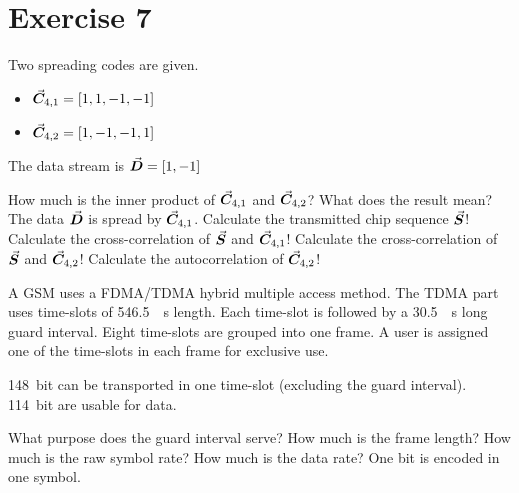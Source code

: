 %
%
%

{}
\section*{Exercise 7}


\begin{question}[subtitle={DS-CDMA}]
	Two spreading codes are given.
	\begin{itemize}
		\item $\vec{\bm{C}}_{4,1} = \left[1,1,-1,-1\right]$
		\item $\vec{\bm{C}}_{4,2} = \left[1,-1,-1,1\right]$
	\end{itemize}

	The data stream is $\vec{\bm{D}} = \left[1,-1\right]$
	
	\begin{tasks}
		\task
		How much is the inner product of $\vec{\bm{C}}_{4,1}$ and $\vec{\bm{C}}_{4,2}$? What does the result mean?
		\task
		The data $\vec{\bm{D}}$ is spread by $\vec{\bm{C}}_{4,1}$. Calculate the transmitted chip sequence $\vec{\bm{S}}$!
		\task
		Calculate the cross-correlation of $\vec{\bm{S}}$ and $\vec{\bm{C}}_{4,1}$!
		\task
		Calculate the cross-correlation of $\vec{\bm{S}}$ and $\vec{\bm{C}}_{4,2}$!
		\task
		Calculate the autocorrelation of $\vec{\bm{C}}_{4,2}$!
	\end{tasks}
\end{question}

\begin{solution}
	\begin{tasks}
	\end{tasks}
\end{solution}

\begin{question}[subtitle={2G cell phone -- GSM}]
	A GSM uses a FDMA/TDMA hybrid multiple access method. The TDMA part uses time-slots of \SI{546.5}{\micro{}s} length. Each time-slot is followed by a \SI{30.5}{\micro{}s} long guard interval. Eight time-slots are grouped into one frame. A user is assigned one of the time-slots in each frame for exclusive use.
	
	\SI{148}{bit} can be transported in one time-slot (excluding the guard interval). \SI{114}{bit} are usable for data.
		
	\begin{tasks}
		\task
		What purpose does the guard interval serve?
		\task
		How much is the frame length?
		\task
		How much is the raw symbol rate?
		\task
		How much is the data rate? One bit is encoded in one symbol.
	\end{tasks}
\end{question}

